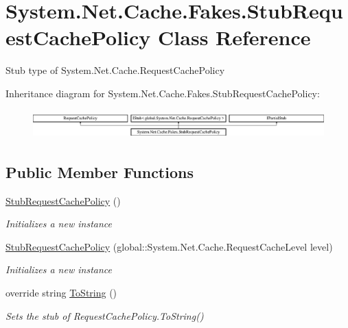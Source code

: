 \hypertarget{class_system_1_1_net_1_1_cache_1_1_fakes_1_1_stub_request_cache_policy}{\section{System.\-Net.\-Cache.\-Fakes.\-Stub\-Request\-Cache\-Policy Class Reference}
\label{class_system_1_1_net_1_1_cache_1_1_fakes_1_1_stub_request_cache_policy}
}


Stub type of System.\-Net.\-Cache.\-Request\-Cache\-Policy 


Inheritance diagram for System.\-Net.\-Cache.\-Fakes.\-Stub\-Request\-Cache\-Policy\-:\begin{figure}[H]
\begin{center}
\leavevmode
\includegraphics[height=1.117764cm]{class_system_1_1_net_1_1_cache_1_1_fakes_1_1_stub_request_cache_policy}
\end{center}
\end{figure}
\subsection*{Public Member Functions}
\begin{DoxyCompactItemize}
\item 
\hyperlink{class_system_1_1_net_1_1_cache_1_1_fakes_1_1_stub_request_cache_policy_a864dc370960f2f77a07873ca4eb81f9a}{Stub\-Request\-Cache\-Policy} ()
\begin{DoxyCompactList}\small\item\em Initializes a new instance\end{DoxyCompactList}\item 
\hyperlink{class_system_1_1_net_1_1_cache_1_1_fakes_1_1_stub_request_cache_policy_a4a850713195e27181920a02d0a95079a}{Stub\-Request\-Cache\-Policy} (global\-::\-System.\-Net.\-Cache.\-Request\-Cache\-Level level)
\begin{DoxyCompactList}\small\item\em Initializes a new instance\end{DoxyCompactList}\item 
override string \hyperlink{class_system_1_1_net_1_1_cache_1_1_fakes_1_1_stub_request_cache_policy_aeedd4cfa48e2040937213dbd9848a8e1}{To\-String} ()
\begin{DoxyCompactList}\small\item\em Sets the stub of Request\-Cache\-Policy.\-To\-String()\end{DoxyCompactList}\end{DoxyCompactItemize}
